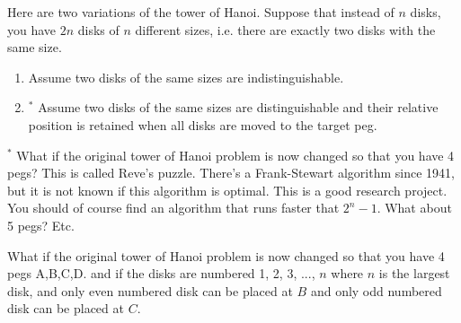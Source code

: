 \newpage
\begin{ex}
Here are two variations of the tower of Hanoi.
Suppose that instead of $n$ disks, you have $2n$ disks
of $n$ different sizes, i.e. 
there are exactly two disks with the same size.
\begin{enumerate}[nosep]
\item Assume two disks of the same sizes are indistinguishable.
\item$^*$ Assume two disks of the same sizes are distinguishable
and their relative position is retained when all disks are moved to the
target peg.
\end{enumerate}
\end{ex}


\begin{ex}$^*$
What if the original tower of Hanoi problem is now changed so
that you have 4 pegs?
This is called Reve's puzzle. There's a Frank-Stewart algorithm since 1941,
but it is not known if this algorithm is optimal.
This is a good research project.
You should of course find an algorithm that runs faster that $2^n - 1$.
What about 5 pegs? Etc.
\end{ex}


\begin{ex}
What if the original tower of Hanoi problem is now changed so
that you have 4 pegs A,B,C,D.
and if the disks are numbered 1, 2, 3, ..., $n$ where $n$ is the largest disk,
and only even numbered disk can be placed at $B$ and only odd numbered disk can
be placed at $C$.
\end{ex}


